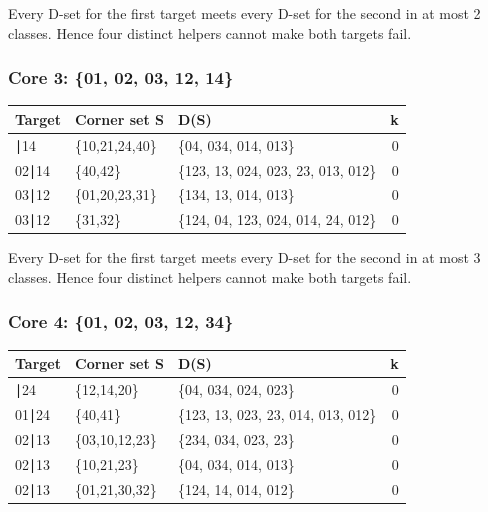 \documentclass[
  10pt,
]{article}
\begin{document}
Every D-set for the first target meets every D-set for the second in at
most 2 classes. Hence four distinct helpers cannot make both targets
fail.

\hypertarget{core-3-01-02-03-12-14}{%
\subsubsection*{Core 3: \{01, 02, 03, 12,
14\}}\label{core-3-01-02-03-12-14}}

\begin{longtable}[]{@{}lllr@{}}
\toprule\noalign{}
Target & Corner set S & D(S) & k \\
\midrule\noalign{}
\endhead
\bottomrule\noalign{}
\endlastfoot
02∣14 & \{10,21,24,40\} & \{04, 034, 014, 013\} & 0 \\
02∣14 & \{40,42\} & \{123, 13, 024, 023, 23, 013, 012\} & 0 \\
03∣12 & \{01,20,23,31\} & \{134, 13, 014, 013\} & 0 \\
03∣12 & \{31,32\} & \{124, 04, 123, 024, 014, 24, 012\} & 0 \\
\end{longtable}

Every D-set for the first target meets every D-set for the second in at
most 3 classes. Hence four distinct helpers cannot make both targets
fail.

\hypertarget{core-4-01-02-03-12-34}{%
\subsubsection*{Core 4: \{01, 02, 03, 12,
34\}}\label{core-4-01-02-03-12-34}}

\begin{longtable}[]{@{}lllr@{}}
\toprule\noalign{}
Target & Corner set S & D(S) & k \\
\midrule\noalign{}
\endhead
\bottomrule\noalign{}
\endlastfoot
01∣24 & \{12,14,20\} & \{04, 034, 024, 023\} & 0 \\
01∣24 & \{40,41\} & \{123, 13, 023, 23, 014, 013, 012\} & 0 \\
02∣13 & \{03,10,12,23\} & \{234, 034, 023, 23\} & 0 \\
02∣13 & \{10,21,23\} & \{04, 034, 014, 013\} & 0 \\
02∣13 & \{01,21,30,32\} & \{124, 14, 014, 012\} & 0 \\
\end{longtable}
\end{document}
